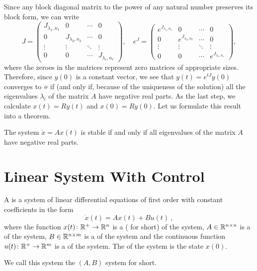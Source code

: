 Since any block diagonal matrix to the power of any natural number preserves its block form, we can write
\begin{equation*}
	J=
	\begin{pmatrix}
		J_{\lambda_1,n_1} & 0 & \cdots & 0 \\
		0 & J_{\lambda_2,n_2} & \cdots & 0 \\
		\vdots & \vdots & \ddots & \vdots \\
		0 & 0 & \cdots & J_{\lambda_r,n_r}
	\end{pmatrix},
	\quad 
	e^J=
	\begin{pmatrix}
		e^{J_{\lambda_1,n_1}} & 0 & \cdots & 0 \\
		0 & e^{J_{\lambda_2,n_2}} & \cdots & 0 \\
		\vdots & \vdots & \ddots & \vdots \\
		0 & 0 & \cdots & e^{J_{\lambda_r,n_r}}
	\end{pmatrix}
	,
\end{equation*}
where the zeroes in the matrices represent zero matrices of appropriate sizes. Therefore, since $y(0)$ is a constant vector, we see that $y(t)=e^{tJ}y(0)$ converges to $\textit{o}$ if (and only if, because of the uniqueness of the solution) all the eigenvalues $\lambda_i$ of the matrix $A$ have negative real parts. As the last step, we calculate $x(t)=Ry(t)$ and $x(0)=Ry(0)$. Let us formulate this result into a theorem.

\begin{theorem}
\label{theorem:stability}
	The system $\dot{x}=Ax(t)$ is stable if and only if all eigenvalues of the matrix $A$ have negative real parts.
\end{theorem}

\section{Linear System With Control}

\begin{definition}
	A  is a system of linear differential equations of first order with constant coefficients in the form $$\dot{x}(t)=Ax(t)+Bu(t)\ ,$$ where the function $x(t)\colon\mathbb{R}^+\to\mathbb{R}^n$ is a  ( for short) of the system, $A\in\mathbb{R}^{n\times n}$ is a  of the system, $B\in\mathbb{R}^{n\times m}$ is a  of the system and the continuous function $u(t)\colon\mathbb{R}^+\to\mathbb{R}^m$ is a  of the system. The  of the system is the state $x(0)$.

	We call this system the $(A,B)$ system for short.
\end{definition}

